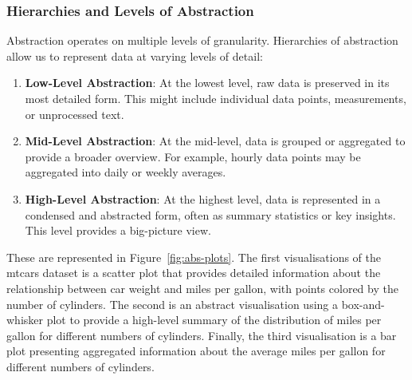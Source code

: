 \documentclass{article}\usepackage[]{graphicx}\usepackage[]{xcolor}
\begin{document}
\subsubsection{Hierarchies and Levels of Abstraction}
Abstraction operates on multiple levels of granularity. Hierarchies of abstraction allow us to represent data at varying levels of detail: 
\begin{enumerate}
    \item \textbf{Low-Level Abstraction}: At the lowest level, raw data is preserved in its most detailed form. This might include individual data points, measurements, or unprocessed text.
    \item \textbf{Mid-Level Abstraction}: At the mid-level, data is grouped or aggregated to provide a broader overview. For example, hourly data points may be aggregated into daily or weekly averages.
    \item \textbf{High-Level Abstraction}: At the highest level, data is represented in a condensed and abstracted form, often as summary statistics or key insights. This level provides a big-picture view.
\end{enumerate}

\noindent 
These are represented in Figure~\ref{fig:abs-plots}. The first visualisations of the mtcars dataset is a scatter plot that provides detailed information about the relationship between car weight and miles per gallon, with points colored by the number of cylinders. The second is an abstract visualisation using a box-and-whisker plot to provide a high-level summary of the distribution of miles per gallon for different numbers of cylinders. Finally, the third visualisation is a bar plot presenting aggregated information about the average miles per gallon for different numbers of cylinders.
\end{document}
